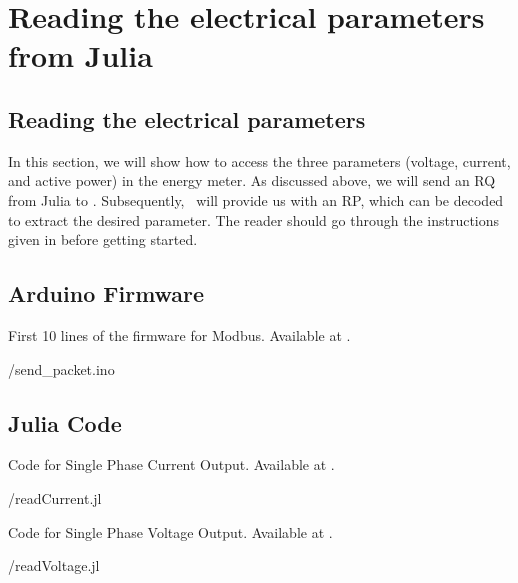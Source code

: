 \section{Reading the electrical parameters from Julia}
\subsection{Reading the electrical parameters}
In this section, we will show how to access the three parameters (voltage, current, and active power) in the energy meter. As discussed above, we will send an RQ from Julia to \arduino. Subsequently, \arduino\ will provide us with an RP, which can be decoded to extract the desired parameter. The reader should go through the instructions given in  before getting started. 

\subsection{Arduino Firmware}
\label{sec:firmware-modbus}
\begin{ardcode}
  {First 10 lines of the firmware for Modbus.  Available at
    .}
  \label{ard:firmware-modbus}
  
  {\LocMODardcode/send_packet.ino}
\end{ardcode}

\subsection{Julia Code}
\label{sec:modbus-julia-code}

\begin{juliacode}
  {Code for Single Phase Current Output.
    Available at .}
  \label{julia:current-modbus}
  
  {\LocMODjuliacode/readCurrent.jl}
\end{juliacode}

\begin{juliacode}
  {Code for Single Phase Voltage Output.
    Available at .}
  \label{julia:voltage-modbus}
  
  {\LocMODjuliacode/readVoltage.jl}
\end{juliacode}

